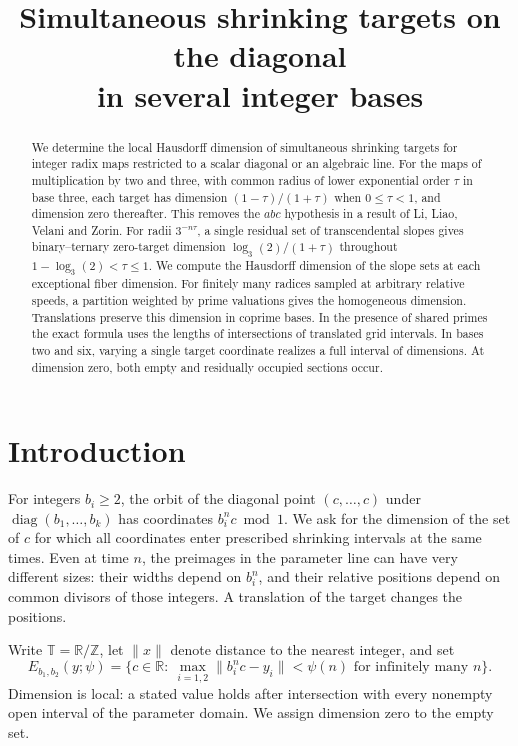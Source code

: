 \documentclass[11pt,reqno,a4paper]{amsart}
\title[Shrinking targets on the diagonal]{Simultaneous shrinking targets on the diagonal\\ in several integer bases}
\date{}
\theoremstyle{remark}
\numberwithin{equation}{section}
\begin{document}
\begin{abstract}
We determine the local Hausdorff dimension of simultaneous shrinking targets for integer radix maps restricted to a scalar diagonal or an algebraic line. For the maps of multiplication by two and three, with common radius of lower exponential order \(\tau\) in base three, each target has dimension \((1-\tau)/(1+\tau)\) when \(0\le\tau<1\), and dimension zero thereafter. This removes the \(abc\) hypothesis in a result of Li, Liao, Velani and Zorin. For radii \(3^{-n\tau}\), a single residual set of transcendental slopes gives binary--ternary zero-target dimension \(\log_3(2)/(1+\tau)\) throughout \(1-\log_3(2)<\tau\le1\). We compute the Hausdorff dimension of the slope sets at each exceptional fiber dimension. For finitely many radices sampled at arbitrary relative speeds, a partition weighted by prime valuations gives the homogeneous dimension. Translations preserve this dimension in coprime bases. In the presence of shared primes the exact formula uses the lengths of intersections of translated grid intervals. In bases two and six, varying a single target coordinate realizes a full interval of dimensions. At dimension zero, both empty and residually occupied sections occur.
\end{abstract}
\maketitle

\section{Introduction}
For integers \(b_i\ge2\), the orbit of the diagonal point \((c,\ldots,c)\) under
\(\operatorname{diag}(b_1,\ldots,b_k)\) has coordinates \(b_i^n c\bmod 1\).
We ask for the dimension of the set of \(c\) for which all coordinates enter prescribed shrinking intervals at the same times. Even at time \(n\), the preimages in the parameter line can have very different sizes: their widths depend on \(b_i^n\), and their relative positions depend on common divisors of those integers. A translation of the target changes the positions.

Write \(\mathbb T=\mathbb R/\mathbb Z\), let \(\|x\|\) denote distance to the nearest integer, and set
\[
 E_{b_1,b_2}(y;\psi)=
 \{c\in\mathbb R:\ \max_{i=1,2}\|b_i^nc-y_i\|<\psi(n)
                  \text{ for infinitely many }n\}.
\]
Dimension is local: a stated value holds after intersection with every nonempty open interval of the parameter domain. We assign dimension zero to the empty set.
\end{document}
